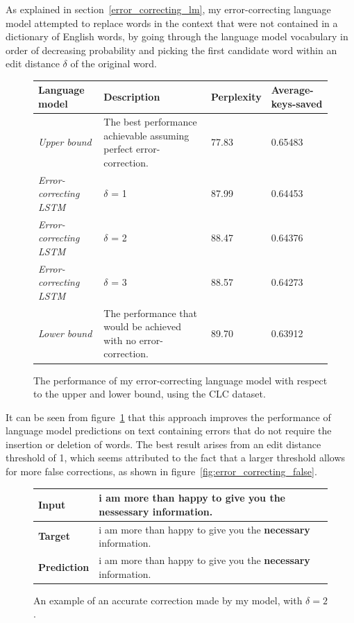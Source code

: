 \documentclass[a4paper, 12pt]{report}
\newcommand{\tbf}[1]{\textbf{#1}}
\newcommand{\tit}[1]{\textit{#1}}
\begin{document}
As explained in section~\ref{error_correcting_lm}, my error-correcting language model attempted to replace words in the context that were not contained in a dictionary of English words, by going through the language model vocabulary in order of decreasing probability and picking the first candidate word within an edit distance $\delta$ of the original word. \\

\begin{figure}[h]
\captionsetup{justification=centering}
\begin{adjustbox}{center}
\begin{tabular}{| L{3.5cm} | L{8cm} | C{2.2cm} | C{2cm} |}
	\hline
	\tbf{Language model} & \tbf{Description} & \tbf{Perplexity} & \tbf{Average-keys-saved} \\ \hline
	\tit{Upper bound} & The best performance achievable assuming perfect error-correction. & 77.83 & 0.65483 \\ \hline
	\tit{Error-correcting LSTM} & $\delta$ = 1 & 87.99 & 0.64453 \\ \hline
	\tit{Error-correcting LSTM} & $\delta$ = 2 & 88.47 & 0.64376 \\ \hline
	\tit{Error-correcting LSTM} & $\delta$ = 3 & 88.57 & 0.64273 \\ \hline
	\tit{Lower bound} & The performance that would be achieved with no error-correction. & 89.70 & 0.63912 \\ \hline
\end{tabular}
\end{adjustbox}
\caption{The performance of my error-correcting language model with respect to the upper and lower bound, using the CLC dataset.}
\label{fig:error_correcting_results}
\end{figure}

It can be seen from figure~\ref{fig:error_correcting_results} that this approach improves the performance of language model predictions on text containing errors that do not require the insertion or deletion of words. The best result arises from an edit distance threshold of 1, which seems attributed to the fact that a larger threshold allows for more false corrections, as shown in figure~\ref{fig:error_correcting_false}.

\begin{figure}[h]
\captionsetup{justification=centering}
\begin{adjustbox}{center}
\begin{tabular}{L{2.5cm} | L{12cm}}
	\tbf{Input} & i am more than happy to give you the \tbf{nessessary} information. \\ \hline
	\tbf{Target} & i am more than happy to give you the \tbf{necessary} information. \\ \hline
	\tbf{Prediction} & i am more than happy to give you the \tbf{necessary} information. \\
\end{tabular}
\end{adjustbox}
\caption{An example of an accurate correction made by my model, with $\delta = 2$.}
\label{fig:error_correcting_good}
\end{figure}
\end{document}
